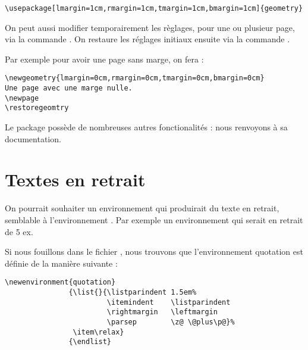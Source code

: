 \begin{verbatim}
\usepackage[lmargin=1cm,rmargin=1cm,tmargin=1cm,bmargin=1cm]{geometry}
\end{verbatim}

On peut aussi modifier temporairement les règlages, pour une ou plusieur page, via la commande . On restaure les réglages initiaux ensuite via la commande .

Par exemple pour avoir une page sans marge, on fera :

\begin{verbatim}
\newgeometry{lmargin=0cm,rmargin=0cm,tmargin=0cm,bmargin=0cm}
Une page avec une marge nulle.
\newpage
\restoregeomtry

\end{verbatim}

Le package  possède de nombreuses autres fonctionalités : nous renvoyons à sa documentation.

\section{Textes en retrait}

On pourrait souhaiter un environnement qui produirait du texte en retrait, semblable à l'environnement . Par exemple un environnement  qui serait en retrait de 5 ex.

Si nous fouillons dans le fichier , nous trouvons que l'environnement quotation est définie de la manière suivante :

\begin{verbatim}
\newenvironment{quotation}
               {\list{}{\listparindent 1.5em%
                        \itemindent    \listparindent
                        \rightmargin   \leftmargin
                        \parsep        \z@ \@plus\p@}%
                \item\relax}
               {\endlist}
\end{verbatim}

